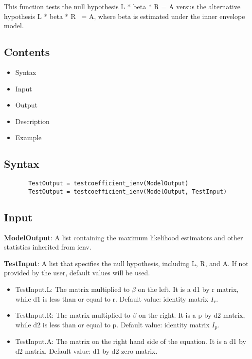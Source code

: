 \documentclass[a4paper,11pt,openany]{memoir}
\begin{document}
This function tests the null hypothesis L * beta * R = A versus the
alternative hypothesis L * beta * R ~= A, where beta is estimated under
the inner envelope model.
    
\subsection*{Contents}

\begin{itemize}
\setlength{\itemsep}{-1ex}
   \item Syntax
   \item Input
   \item Output
   \item Description
   \item Example
\end{itemize}


\subsection*{Syntax}


\begin{verbatim}       TestOutput = testcoefficient_ienv(ModelOutput)
       TestOutput = testcoefficient_ienv(ModelOutput, TestInput)\end{verbatim}
    

\subsection*{Input}

\begin{par}
\textbf{ModelOutput}: A list containing the maximum likelihood estimators and other statistics inherited from ienv.
\end{par} \vspace{1em}
\begin{par}
\textbf{TestInput}: A list that specifies the null hypothesis, including L, R, and A.  If not provided by the user, default values will be used.
\end{par} \vspace{1em}
\begin{itemize}
\setlength{\itemsep}{-1ex}
   \item TestInput.L: The matrix multiplied to $\beta$ on the left.  It is a d1 by r matrix, while d1 is less than or equal to r.  Default value: identity matrix $I_r$.
   \item TestInput.R: The matrix multiplied to $\beta$ on the right.  It is a p by d2 matrix, while d2 is less than or equal to p.  Default value: identity matrix $I_p$.
   \item TestInput.A: The matrix on the right hand side of the equation.  It is a d1 by d2 matrix.  Default value: d1 by d2 zero matrix.
\end{itemize}
\end{document}
